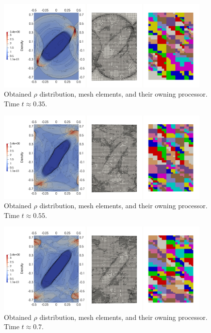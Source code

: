 \begin{figure}[H]
	\begin{center}
		\includegraphics[width=0.95\textwidth]{img/mhd-blast/new/adapt-full6.jpg}
\vspace{-3mm}
	\caption{Obtained $\rho$ distribution, mesh elements, and their owning processor. Time $t\approx 0.35$.}
	\label{figure:amrBlast5}
	\end{center}
\end{figure}
\vspace{-10mm}

\begin{figure}[H]
	\begin{center}
		\includegraphics[width=0.95\textwidth]{img/mhd-blast/new/adapt-full10.jpg}
\vspace{-3mm}
	\caption{Obtained $\rho$ distribution, mesh elements, and their owning processor. Time $t\approx 0.55$.}
	\label{figure:amrBlast6}
	\end{center}
\end{figure}
\vspace{-10mm}


\begin{figure}[H]
	\begin{center}
		\includegraphics[width=0.95\textwidth]{img/mhd-blast/new/adapt-full13.jpg}
\vspace{-3mm}
	\caption{Obtained $\rho$ distribution, mesh elements, and their owning processor. Time $t\approx 0.7$.}
	\label{figure:amrBlast7}
	\end{center}
\end{figure}
\vspace{-10mm}


